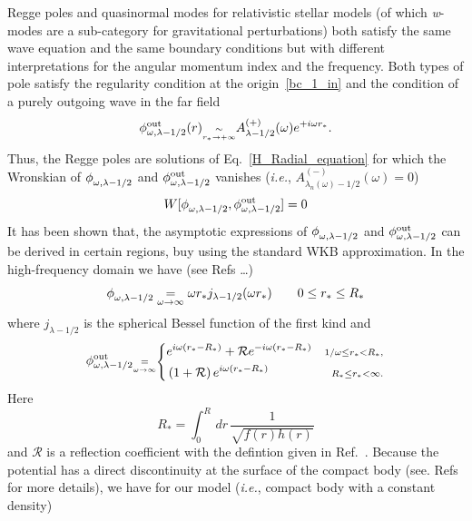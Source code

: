 \documentclass[aps,prd,longbibliography,reprint,twocolumn,amsmath,amssymb,amsfonts,showpacs,superscriptaddress]{revtex4-1}%
\begin{document}
Regge poles and quasinormal modes for relativistic stellar models (of which \textit{w}-modes are a sub-category for gravitational perturbations) both satisfy the same wave equation and the same boundary conditions but with different interpretations for the angular momentum index and the frequency. Both types of pole satisfy the regularity condition at the origin~\eqref{bc_1_in} and the condition of a purely outgoing wave in the far field
%
\begin{equation}\label{bc_pole_inf}
\phi^{\text{out}}_{\omega, \lambda-1/2} (r) \scriptstyle{\underset{r_\ast \to +\infty}{\sim}}
\displaystyle{  A^{(+)}_{\lambda-1/2} (\omega) e^{+i\omega r_\ast}}.
\end{equation}
%
Thus, the Regge poles are solutions of Eq.~\eqref{H_Radial_equation} for which the  Wronskian of $\phi^{}_{\omega, \lambda-1/2}$ and $\phi^{\text{out}}_{\omega, \lambda-1/2}$ vanishes (\textit{i.e.}, $A^{(-)}_{\lambda_n(\omega)-1/2} (\omega)=0$)
\begin{equation}\label{Wronskian}
  W[\phi^{}_{\omega, \lambda-1/2}, \phi^{\text{out}}_{\omega, \lambda-1/2} ]= 0
\end{equation}
It has been shown that, the asymptotic expressions of $\phi^{}_{\omega, \lambda-1/2}$ and $\phi^{\text{out}}_{\omega, \lambda-1/2}$ can be derived in certain regions, buy using the standard WKB approximation. In the high-frequency domain we have (see Refs \ldots)
\begin{equation}\label{Approx_origin}
  \phi^{}_{\omega, \lambda-1/2} \underset{\omega \to \infty}{=} \omega r_* j_{\lambda-1/2} (\omega r_*) \quad\quad 0\leq r_*\leq R_*
\end{equation}
where $j_{\lambda-1/2}$ is the spherical Bessel function of the first kind and
\begin{equation}
\label{Approx_infinity}
\phi^{\text{out}}_{\omega, \lambda-1/2}  \scriptstyle{\underset{\omega \to \infty}{=}}
\left\{
\begin{aligned}
&e^{i\omega(r_*-R_*)}+\mathcal{R} e^{-i\omega (r_*-R_*)}& \scriptstyle{1/\omega\leq r_{*} < R_*,}\\
&\left(1+\mathcal{R}\right) e^{i\omega(r_*-R_*)}        & \scriptstyle{R_*\leq r_{*}<\infty.}
\end{aligned}
\right.
\end{equation}
Here
\begin{equation}\label{R_star}
  R_*=\int_{0}^{R}\, dr\,\frac{1}{\sqrt{f(r)h(r)}}
\end{equation}
and $\mathcal{R}$ is a reflection coefficient with the defintion given in Ref.~\cite{Berry_1982}.
Because the potential has a direct discontinuity at the surface of the compact body (see. Refs \cite{Zhang:2011pq,Berry_1982} for more details), we have for our model (\textit{i.e.}, compact body with a constant density)
\end{document}
